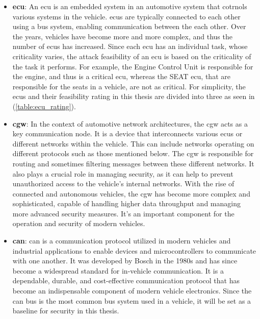 \begin{itemize}
    \item \textbf{\acrshort{ecu}}: An \acrshort{ecu} is an embedded system in an automotive system that cotrnols various systems in the vehicle.
    \acrshort{ecu}s are typically connected to each other using a bus system, enabling communication between the each other.
    Over the years, vehicles have become more and more complex, and thus the number of \acrshort{ecu}s has increased.
    Since each \acrshort{ecu} has an individual task, whose criticality varies, the attack feasibility of an \acrshort{ecu} is based on the criticality of the task it performs.
    For example, the Engine Control Unit is responsible for the engine, and thus is a critical \acrshort{ecu}, 
    whereas the SEAT \acrshort{ecu}, that are responsible for the seats in a vehicle, are not as critical.
    For simplicity, the \acrshort{ecu}s and their feasibility rating in this thesis are divided into three as seen in (\ref{table:ecu_rating}).

    \item \textbf{\acrlong{cgw}}: In the context of automotive network architectures, the \acrshort{cgw} acts as a key communication node. 
    It is a device that interconnects various \acrshort{ecu}s or different networks within the vehicle. 
    This can include networks operating on different protocols such as those mentioned below.
    The \acrshort{cgw} is responsible for routing and sometimes filtering messages between these different networks. 
    It also plays a crucial role in managing security, as it can help to prevent unauthorized access to the vehicle's internal networks.
    With the rise of connected and autonomous vehicles, the \acrshort{cgw} has become more complex and sophisticated, 
    capable of handling higher data throughput and managing more advanced security measures. 
    It's an important component for the operation and security of modern vehicles.
    
    \item \textbf{\acrlong{can}}: \acrshort{can} is a communication protocol utilized in modern vehicles and industrial applications 
    to enable devices and microcontrollers to communicate with one another. 
    It was developed by Bosch in the 1980s and has since become a widespread standard for in-vehicle communication.
    It is a dependable, durable, and cost-effective communication protocol that has become an indispensable component of modern vehicle electronics.
    Since the \acrshort{can} bus is the most common bus system used in a vehicle, it will be set as a baseline for security in this thesis.


\end{itemize}
